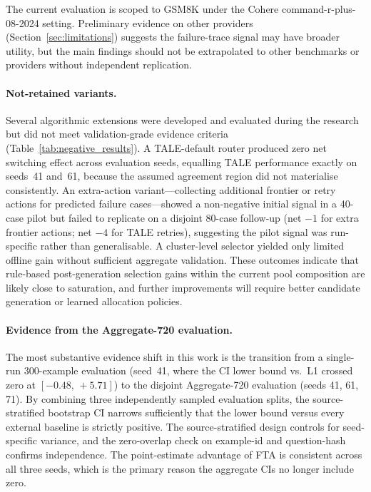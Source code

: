 \documentclass[smallcondensed]{svjour3}
\begin{document}
The current evaluation is scoped to GSM8K under the Cohere
command-r-plus-08-2024 setting.
Preliminary evidence on other providers (Section~\ref{sec:limitations}) suggests
the failure-trace signal may have broader utility, but the main findings should
not be extrapolated to other benchmarks or providers without independent
replication.

\paragraph{Not-retained variants.}
Several algorithmic extensions were developed and evaluated during the research
but did not meet validation-grade evidence criteria
(Table~\ref{tab:negative_results}).
A TALE-default router produced zero net switching effect across evaluation
seeds, equalling TALE performance exactly on seeds~41 and~61, because the
assumed agreement region did not materialise consistently.
An extra-action variant---collecting additional frontier or retry actions for
predicted failure cases---showed a non-negative initial signal in a 40-case
pilot but failed to replicate on a disjoint 80-case follow-up
(net $-1$ for extra frontier actions; net $-4$ for TALE retries), suggesting
the pilot signal was run-specific rather than generalisable.
A cluster-level selector yielded only limited offline gain without sufficient
aggregate validation.
These outcomes indicate that rule-based post-generation selection gains within
the current pool composition are likely close to saturation, and further
improvements will require better candidate generation or learned allocation
policies.

\paragraph{Evidence from the Aggregate-720 evaluation.}
The most substantive evidence shift in this work is the transition from a
single-run 300-example evaluation (seed~41, where the CI lower bound vs.\ L1
crossed zero at $[-0.48,\, +5.71]$) to the disjoint Aggregate-720 evaluation
(seeds 41, 61, 71).
By combining three independently sampled evaluation splits, the
source-stratified bootstrap CI narrows sufficiently that the lower bound
versus every external baseline is strictly positive.
The source-stratified design controls for seed-specific variance, and the
zero-overlap check on example-id and question-hash confirms independence.
The point-estimate advantage of FTA is consistent across all three seeds,
which is the primary reason the aggregate CIs no longer include zero.
\end{document}
